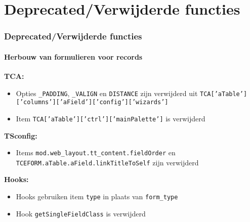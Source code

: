 %

\section{Deprecated/Verwijderde functies}


\begin{frame}[fragile]
	\frametitle{Deprecated/Verwijderde functies}
	\framesubtitle{Herbouw van formulieren voor records}

		\textbf{TCA:}

			\small
			\begin{itemize}

				\item Opties \texttt{\_PADDING}, \texttt{\_VALIGN} en \texttt{DISTANCE}
					zijn verwijderd uit
					\texttt{TCA['aTable']['columns']['aField']['config']['wizards']}

				\item Item \texttt{TCA['aTable']['ctrl']['mainPalette']} is verwijderd

			\end{itemize}

		\textbf{TSconfig:}

			\small
			\begin{itemize}
				\item Items \texttt{mod.web\_layout.tt\_content.fieldOrder} en
					\texttt{TCEFORM.aTable.aField.linkTitleToSelf} zijn verwijderd
			\end{itemize}

		\textbf{Hooks:}

			\small
			\begin{itemize}
				\item Hooks gebruiken item \texttt{type} in plaats van \texttt{form\_type}
				\item Hook \texttt{getSingleFieldClass} is verwijderd
			\end{itemize}

\end{frame}

